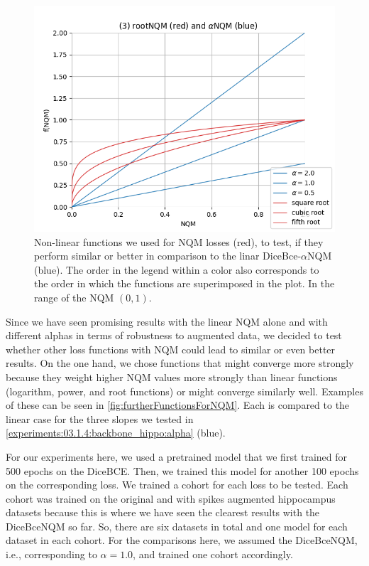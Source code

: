 \begin{figure}[h!]
\begin{minipage}{0.49\textwidth}
    \end{minipage}
    \begin{minipage}{0.49\textwidth}
        \centering
        \includegraphics[width=\linewidth]{Graphics/Experiments/3.1_alphas_root.png}
    \end{minipage}
    \caption{Non-linear functions we used for NQM losses (red), to test, if they perform similar or better in comparison to the linar DiceBce-$\alpha$NQM (blue). The order in the legend within a color also corresponds to the order in which the functions are superimposed in the plot. In the range of the NQM $(0, 1)$.}
    \label{fig:furtherFunctionsForNQM}
\end{figure}

Since we have seen promising results with the linear NQM alone and with different alphas in terms of robustness to augmented data, we decided to test whether other loss functions with NQM could lead to similar or even better results. On the one hand, we chose functions that might converge more strongly because they weight higher NQM values more strongly than linear functions (logarithm, power, and root functions) or might converge similarly well. Examples of these can be seen in \autoref{fig:furtherFunctionsForNQM}. Each is compared to the linear case for the three slopes we tested in \autoref{experiments:03.1.4:backbone_hippo:alpha} (blue). 

For our experiments here, we used a pretrained model that we first trained for 500 epochs on the DiceBCE. Then, we trained this model for another 100 epochs on the corresponding loss.
We trained a cohort for each loss to be tested. Each cohort was trained on the original and with spikes augmented hippocampus datasets because this is where we have seen the clearest results with the DiceBceNQM so far. So, there are six datasets in total and one model for each dataset in each cohort. For the comparisons here, we assumed the DiceBceNQM, i.e., corresponding to $\alpha=1.0$, and trained one cohort accordingly.

